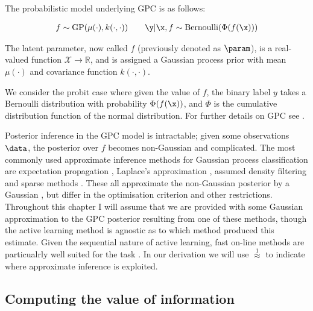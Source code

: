 The probabilistic model underlying GPC is as follows:

\begin{align}
	f \sim \mathrm{GP}(\mu(\cdot),k(\cdot,\cdot)) \qquad \y\vert\x,f \sim\mathrm{Bernoulli}(\Phi(f(\x))) 
\end{align}

The latent parameter, now called $f$ (previously denoted as $\param$), is a real-valued function $\mathcal{X}\rightarrow\mathbb{R}$, and is assigned a Gaussian process prior with mean $\mu(\cdot)$ and covariance function $k(\cdot,\cdot)$.

We consider the probit case where given the value of $f$, the binary label $y$ takes a Bernoulli distribution with probability $\Phi(f(\x))$, and $\Phi$ is the cumulative distribution function of the normal distribution. For further details on GPC see \citep{rasmussen2005}.

Posterior inference in the GPC model is intractable; given some observations $\data$, the posterior over $f$ becomes non-Gaussian and complicated. The most commonly used approximate inference methods for Gaussian process classification are expectation propagation \citep[EP,][]{Minka2002}, Laplace's approximation \citep{williams1998}, assumed density filtering \citep[ADF,][]{csato2000} and sparse methods \citep{candela05sparseGP}. These all approximate the non-Gaussian posterior by a Gaussian \citep{Nickisch2008}, but differ in the optimisation criterion and other restrictions. Throughout this chapter I will assume that we are provided with some Gaussian approximation to the GPC posterior resulting from one of these methods, though the active learning method is agnostic as to which method produced this estimate. Given the sequential nature of active learning, fast on-line methods are particualrly well suited for the task \citep{Csato2002}. In our derivation we will use {\scriptsize$\stackrel{1}{\approx}$} to indicate where approximate inference is exploited.

\subsection{Computing the value of information}

